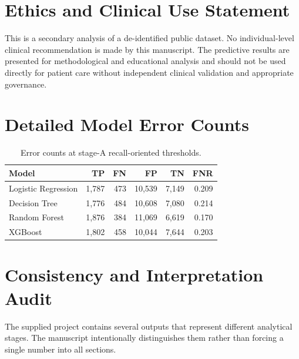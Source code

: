 \documentclass[10pt,a4paper]{article}
\begin{document}
\section*{Ethics and Clinical Use Statement}
This is a secondary analysis of a de-identified public dataset. No individual-level clinical recommendation is made by this manuscript. The predictive results are presented for methodological and educational analysis and should not be used directly for patient care without independent clinical validation and appropriate governance.

\appendix
\section{Detailed Model Error Counts}

\begin{table}[H]
\centering
\caption{Error counts at stage-A recall-oriented thresholds.}
\label{tab:errorcounts}
\begin{tabular}{lrrrrr}
\toprule
Model & TP & FN & FP & TN & FNR\\
\midrule
Logistic Regression & 1,787 & 473 & 10,539 & 7,149 & 0.209\\
Decision Tree & 1,776 & 484 & 10,608 & 7,080 & 0.214\\
Random Forest & 1,876 & 384 & 11,069 & 6,619 & 0.170\\
XGBoost & 1,802 & 458 & 10,044 & 7,644 & 0.203\\
\bottomrule
\end{tabular}
\end{table}

\section{Consistency and Interpretation Audit}

The supplied project contains several outputs that represent different analytical stages. The manuscript intentionally distinguishes them rather than forcing a single number into all sections.
\end{document}
